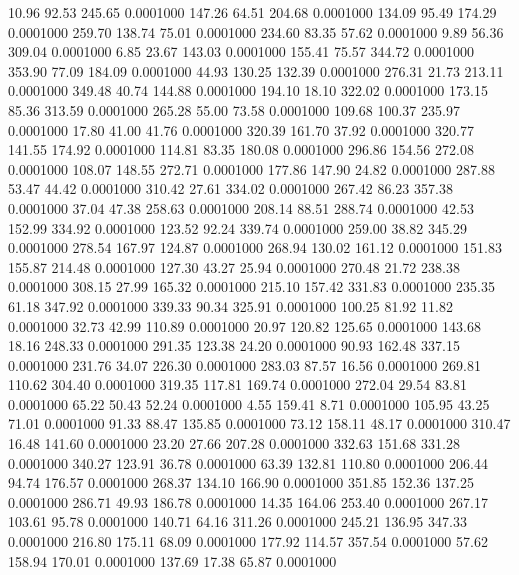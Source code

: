   10.96   92.53  245.65   0.0001000
 147.26   64.51  204.68   0.0001000
 134.09   95.49  174.29   0.0001000
 259.70  138.74   75.01   0.0001000
 234.60   83.35   57.62   0.0001000
   9.89   56.36  309.04   0.0001000
   6.85   23.67  143.03   0.0001000
 155.41   75.57  344.72   0.0001000
 353.90   77.09  184.09   0.0001000
  44.93  130.25  132.39   0.0001000
 276.31   21.73  213.11   0.0001000
 349.48   40.74  144.88   0.0001000
 194.10   18.10  322.02   0.0001000
 173.15   85.36  313.59   0.0001000
 265.28   55.00   73.58   0.0001000
 109.68  100.37  235.97   0.0001000
  17.80   41.00   41.76   0.0001000
 320.39  161.70   37.92   0.0001000
 320.77  141.55  174.92   0.0001000
 114.81   83.35  180.08   0.0001000
 296.86  154.56  272.08   0.0001000
 108.07  148.55  272.71   0.0001000
 177.86  147.90   24.82   0.0001000
 287.88   53.47   44.42   0.0001000
 310.42   27.61  334.02   0.0001000
 267.42   86.23  357.38   0.0001000
  37.04   47.38  258.63   0.0001000
 208.14   88.51  288.74   0.0001000
  42.53  152.99  334.92   0.0001000
 123.52   92.24  339.74   0.0001000
 259.00   38.82  345.29   0.0001000
 278.54  167.97  124.87   0.0001000
 268.94  130.02  161.12   0.0001000
 151.83  155.87  214.48   0.0001000
 127.30   43.27   25.94   0.0001000
 270.48   21.72  238.38   0.0001000
 308.15   27.99  165.32   0.0001000
 215.10  157.42  331.83   0.0001000
 235.35   61.18  347.92   0.0001000
 339.33   90.34  325.91   0.0001000
 100.25   81.92   11.82   0.0001000
  32.73   42.99  110.89   0.0001000
  20.97  120.82  125.65   0.0001000
 143.68   18.16  248.33   0.0001000
 291.35  123.38   24.20   0.0001000
  90.93  162.48  337.15   0.0001000
 231.76   34.07  226.30   0.0001000
 283.03   87.57   16.56   0.0001000
 269.81  110.62  304.40   0.0001000
 319.35  117.81  169.74   0.0001000
 272.04   29.54   83.81   0.0001000
  65.22   50.43   52.24   0.0001000
   4.55  159.41    8.71   0.0001000
 105.95   43.25   71.01   0.0001000
  91.33   88.47  135.85   0.0001000
  73.12  158.11   48.17   0.0001000
 310.47   16.48  141.60   0.0001000
  23.20   27.66  207.28   0.0001000
 332.63  151.68  331.28   0.0001000
 340.27  123.91   36.78   0.0001000
  63.39  132.81  110.80   0.0001000
 206.44   94.74  176.57   0.0001000
 268.37  134.10  166.90   0.0001000
 351.85  152.36  137.25   0.0001000
 286.71   49.93  186.78   0.0001000
  14.35  164.06  253.40   0.0001000
 267.17  103.61   95.78   0.0001000
 140.71   64.16  311.26   0.0001000
 245.21  136.95  347.33   0.0001000
 216.80  175.11   68.09   0.0001000
 177.92  114.57  357.54   0.0001000
  57.62  158.94  170.01   0.0001000
 137.69   17.38   65.87   0.0001000
